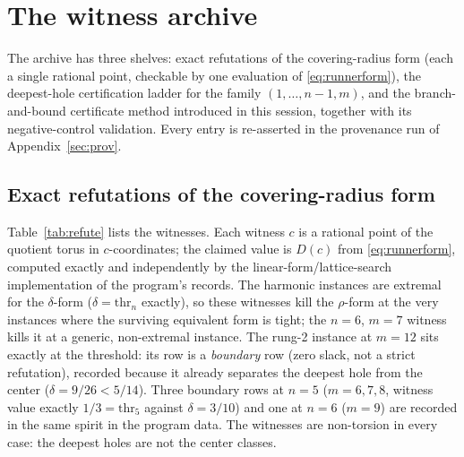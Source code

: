 
\section{The witness archive}\label{sec:witness}

The archive has three shelves: exact refutations of the covering-radius
form (each a single rational point, checkable by one evaluation of
\eqref{eq:runnerform}), the deepest-hole certification ladder for the
family $(1,\dots,n{-}1,m)$, and the branch-and-bound certificate method
introduced in this session, together with its negative-control
validation. Every entry is re-asserted in the provenance run of
Appendix~\ref{sec:prov}.

\subsection{Exact refutations of the covering-radius form}

Table~\ref{tab:refute} lists the witnesses. Each witness $c$ is a
rational point of the quotient torus in $c$-coordinates; the claimed
value is $D(c)$ from \eqref{eq:runnerform}, computed exactly and
independently by the linear-form/lattice-search implementation of the
program's records. The harmonic instances are extremal for the
$\delta$-form ($\delta=\mathrm{thr}_n$ exactly), so these witnesses kill
the $\rho$-form at the very instances where the surviving equivalent form
is tight; the $n=6$, $m=7$ witness kills it at a generic, non-extremal
instance. The rung-2 instance at $m=12$ sits exactly at the threshold:
its row is a \emph{boundary} row (zero slack, not a strict refutation),
recorded because it already separates the deepest hole from the center
($\delta=9/26<5/14$). Three boundary rows at $n=5$ ($m=6,7,8$, witness
value exactly $1/3=\mathrm{thr}_5$ against $\delta=3/10$) and one at
$n=6$ ($m=9$) are recorded in the same spirit in the program data. The
witnesses are non-torsion in every case: the deepest holes are not the
center classes.

